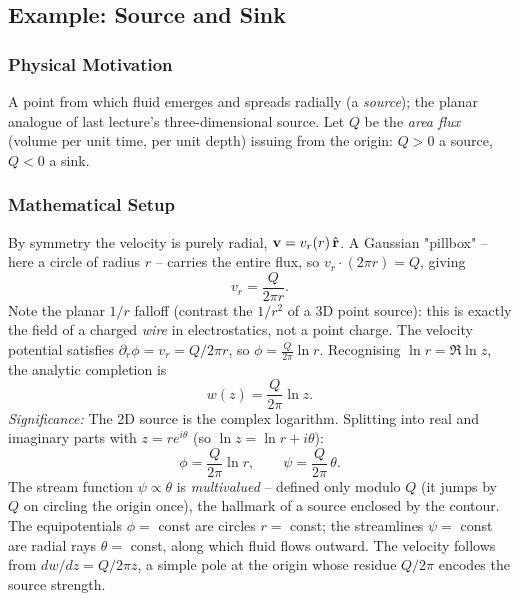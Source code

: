 \documentclass[../main.tex]{subfiles}
\begin{document}
\subsection{Example: Source and Sink}\label{sec:lec17:source}

\subsubsection*{Physical Motivation}
A point from which fluid emerges and spreads radially (a \emph{source}); the planar analogue of last lecture's three-dimensional source. Let $Q$ be the \emph{area flux} (volume per unit time, per unit depth) issuing from the origin: $Q>0$ a source, $Q<0$ a sink.

\subsubsection*{Mathematical Setup}
By symmetry the velocity is purely radial, $\mathbf{v}=v_r(r)\,\hat{\mathbf{r}}$. A Gaussian "pillbox" -- here a circle of radius $r$ -- carries the entire flux, so $v_r\cdot(2\pi r)=Q$, giving
\begin{equation}
  v_r = \frac{Q}{2\pi r}.
  \label{eq:lec17_source_vr}
\end{equation}
Note the planar $1/r$ falloff (contrast the $1/r^2$ of a 3D point source): this is exactly the field of a charged \emph{wire} in electrostatics, not a point charge. The velocity potential satisfies $\partial_r\phi=v_r=Q/2\pi r$, so $\phi=\tfrac{Q}{2\pi}\ln r$. Recognising $\ln r=\Re\ln z$, the analytic completion is
\begin{equation}
  \boxed{w(z) = \frac{Q}{2\pi}\ln z.}
  \label{eq:lec17_source_w}
\end{equation}
\textit{Significance:} The 2D source is the complex logarithm. Splitting into real and imaginary parts with $z=re^{i\theta}$ (so $\ln z=\ln r+i\theta$):
\begin{equation}
  \phi = \frac{Q}{2\pi}\ln r,\qquad \psi = \frac{Q}{2\pi}\,\theta.
  \label{eq:lec17_source_phipsi}
\end{equation}
The stream function $\psi\propto\theta$ is \emph{multivalued} -- defined only modulo $Q$ (it jumps by $Q$ on circling the origin once), the hallmark of a source enclosed by the contour. The equipotentials $\phi=$ const are circles $r=$ const; the streamlines $\psi=$ const are radial rays $\theta=$ const, along which fluid flows outward. The velocity follows from $dw/dz=Q/2\pi z$, a simple pole at the origin whose residue $Q/2\pi$ encodes the source strength.
\end{document}
